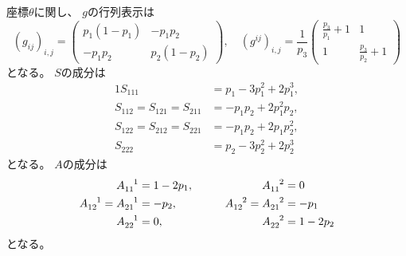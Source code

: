 \documentclass[report]{jlreq}
\begin{document}
\begin{proposition}[$n = 3$での$g, S, A$の計算]
    座標$\theta$に関し、
    $g$の行列表示は
    \begin{equation}
        (g_{ij})_{i, j}
            = \begin{pmatrix}
                p_1 (1 - p_1) & - p_1 p_2 \\
                - p_1 p_2 & p_2 (1 - p_2)
            \end{pmatrix},
            \quad
        (g^{ij})_{i, j}
            = \frac{1}{p_3}
                \begin{pmatrix}
                    \frac{p_3}{p_1} + 1 & 1 \\
                    1 & \frac{p_3}{p_2} + 1
                \end{pmatrix}
    \end{equation}
    となる。
    $S$の成分は
    \begin{alignat}{1}
        S_{111}
            &= p_1 - 3 p_1^2 + 2 p_1^3, \\
        S_{112} = S_{121} = S_{211}
            &= - p_1 p_2 + 2 p_1^2 p_2, \\
        S_{122} = S_{212} = S_{221}
            &= - p_1 p_2 + 2 p_1 p_2^2, \\
        S_{222}
            &= p_2 - 3 p_2^2 + 2 p_2^3
    \end{alignat}
    となる。
    $A$の成分は
    \begin{alignat}{2}
        A_{11}^{\hphantom{11}1}
            &=
                1 - 2p_1,
                \qquad
        &A_{11}^{\hphantom{11}2}
            &=
                0
                \\
        A_{12}^{\hphantom{12}1}
            =
                A_{21}^{\hphantom{21}1}
            &=
                - p_2,
                \qquad
        &A_{12}^{\hphantom{12}2}
            =
                A_{21}^{\hphantom{21}2}
            &=
                - p_1
                \\
        A_{22}^{\hphantom{22}1}
            &=
                0,
                \qquad
        &A_{22}^{\hphantom{22}2}
            &=
                1 - 2p_2
    \end{alignat}
    となる。
\end{proposition}
\end{document}
